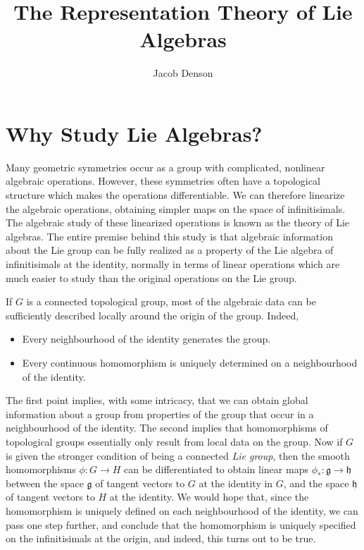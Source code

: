 

\title{The Representation Theory of Lie Algebras}
\author{Jacob Denson}




\maketitle

\tableofcontents


\chapter{Why Study Lie Algebras?}

Many geometric symmetries occur as a group with complicated, nonlinear algebraic operations. However, these symmetries often have a topological structure which makes the operations differentiable. We can therefore linearize the algebraic operations, obtaining simpler maps on the space of infinitisimals. The algebraic study of these linearized operations is known as the theory of Lie algebras. The entire premise behind this study is that algebraic information about the Lie group can be fully realized as a property of the Lie algebra of infinitisimals at the identity, normally in terms of linear operations which are much easier to study than the original operations on the Lie group.

If $G$ is a connected topological group, most of the algebraic data can be sufficiently described locally around the origin of the group. Indeed,
%
\begin{itemize}
    \item Every neighbourhood of the identity generates the group.
    \item Every continuous homomorphism is uniquely determined on a neighbourhood of the identity.
\end{itemize}
%
The first point implies, with some intricacy, that we can obtain global information about a group from properties of the group that occur in a neighbourhood of the identity. The second implies that homomorphisms of topological groups essentially only result from local data on the group. Now if $G$ is given the stronger condition of being a connected {\it Lie group}, then the smooth homomorphisms $\phi: G \to H$ can be differentiated to obtain linear maps $\phi_*: \mathfrak{g} \to \mathfrak{h}$ between the space $\mathfrak{g}$ of tangent vectors to $G$ at the identity in $G$, and the space $\mathfrak{h}$ of tangent vectors to $H$ at the identity. We would hope that, since the homomorphism is uniquely defined on each neighbourhood of the identity, we can pass one step further, and conclude that the homomorphism is uniquely specified on the infinitisimals at the origin, and indeed, this turns out to be true.

